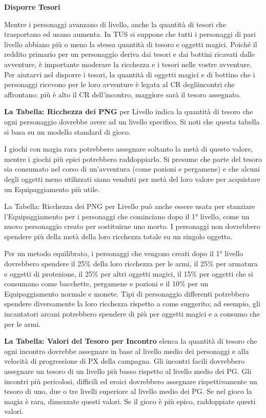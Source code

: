 \documentclass[a4paper,11pt,twoside,openany]{book}
\begin{document}
\textbf{Disporre Tesori}

Mentre i personaggi avanzano di livello, anche la quantità di tesori che trasportano ed usano aumenta. In TUS si suppone che tutti i personaggi di pari livello abbiano più o meno la stessa quantità di tesoro e oggetti magici. Poiché il reddito primario per un personaggio deriva dai tesori e dai bottini ricavati dalle avventure, è importante moderare la ricchezza e i tesori nelle vostre avventure. Per aiutarvi nel disporre i tesori, la quantità di oggetti magici e di bottino che i personaggi ricevono per le loro avventure è legata al CR degliincontri che affrontano: più è alto il CR dell'incontro, maggiore sarà il tesoro assegnato.

\textbf{La Tabella: Ricchezza dei PNG} per Livello indica la quantità di tesoro che ogni personaggio dovrebbe avere ad un livello specifico. Si noti che questa tabella si basa su un modello standard di gioco.

I giochi con magia rara potrebbero assegnare soltanto la metà di questo valore, mentre i giochi più epici potrebbero raddoppiarlo. Si presume che parte del tesoro sia consumato nel corso di un'avventura (come pozioni e pergamene) e che alcuni degli oggetti meno utilizzati siano venduti per metà del loro valore per acquistare un Equipaggiamento più utile.

La Tabella: Ricchezza dei PNG per Livello può anche essere usata per stanziare l'Equipaggiamento per i personaggi che cominciano dopo il 1° livello, come un nuovo personaggio creato per sostituirne uno morto. I personaggi non dovrebbero spendere più della metà della loro ricchezza totale su un singolo oggetto.

Per un metodo equilibrato, i personaggi che vengono creati dopo il 1° livello dovrebbero spendere il 25\% della loro ricchezza per le armi, il 25\% per armatura e oggetti di protezione, il 25\% per altri oggetti magici, il 15\% per oggetti che si consumano come bacchette, pergamene e pozioni e il 10\% per un Equipaggiamento normale e monete. Tipi di personaggio differenti potrebbero spendere diversamente la loro ricchezza rispetto a come suggerito; ad esempio, gli incantatori arcani potrebbero spendere di più per oggetti magici e a consumo che per le armi.

\textbf{La Tabella: Valori del Tesoro per Incontro} elenca la quantità di tesoro che ogni incontro dovrebbe assegnare in base al livello medio dei personaggi e alla velocità di progressione di PX della campagna. Gli incontri facili dovrebbero assegnare un tesoro di un livello più basso rispetto al livello medio dei PG. Gli incontri più pericolosi, difficili ed eroici dovrebbero assegnare rispettivamente un tesoro di uno, due o tre livelli superiore al livello medio dei PG. Se nel gioco la magia è rara, dimezzate questi valori. Se il gioco è più epico, raddoppiate questi valori.
\end{document}
